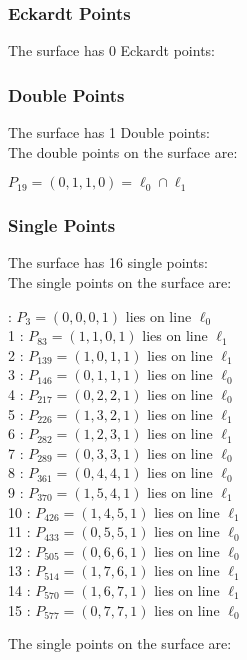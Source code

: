 \documentclass{article}
\begin{document}
{\subsubsection*{Eckardt Points}
The surface has 0 Eckardt points:\\
\subsubsection*{Double Points}
The surface has 1 Double points:\\
The double points on the surface are:\\
\begin{multicols}{2}
\noindent
$P_{19} = ( 0, 1, 1, 0 ) = \ell_{0} \cap \ell_{1} $\\
\end{multicols}
\subsubsection*{Single Points}
The surface has 16 single points:\\
The single points on the surface are:\\
\begin{multicols}{2}
 : $P_{3}=( 0, 0, 0, 1 )$ lies on line $\ell_{0}$\\
1 : $P_{83}=( 1, 1, 0, 1 )$ lies on line $\ell_{1}$\\
2 : $P_{139}=( 1, 0, 1, 1 )$ lies on line $\ell_{1}$\\
3 : $P_{146}=( 0, 1, 1, 1 )$ lies on line $\ell_{0}$\\
4 : $P_{217}=( 0, 2, 2, 1 )$ lies on line $\ell_{0}$\\
5 : $P_{226}=( 1, 3, 2, 1 )$ lies on line $\ell_{1}$\\
6 : $P_{282}=( 1, 2, 3, 1 )$ lies on line $\ell_{1}$\\
7 : $P_{289}=( 0, 3, 3, 1 )$ lies on line $\ell_{0}$\\
8 : $P_{361}=( 0, 4, 4, 1 )$ lies on line $\ell_{0}$\\
9 : $P_{370}=( 1, 5, 4, 1 )$ lies on line $\ell_{1}$\\
10 : $P_{426}=( 1, 4, 5, 1 )$ lies on line $\ell_{1}$\\
11 : $P_{433}=( 0, 5, 5, 1 )$ lies on line $\ell_{0}$\\
12 : $P_{505}=( 0, 6, 6, 1 )$ lies on line $\ell_{0}$\\
13 : $P_{514}=( 1, 7, 6, 1 )$ lies on line $\ell_{1}$\\
14 : $P_{570}=( 1, 6, 7, 1 )$ lies on line $\ell_{1}$\\
15 : $P_{577}=( 0, 7, 7, 1 )$ lies on line $\ell_{0}$\\
\end{multicols}
The single points on the surface are:\\
}
\end{document}
